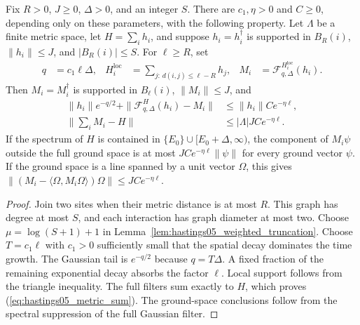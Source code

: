 \begin{lemma}
    \label{thm:hastings05_metric_filter}
    \leanok
    Fix $R>0$, $J\ge0$, $\Delta>0$, and an integer $S$. There are
    $c_1,\eta>0$ and $C\ge0$, depending only on these parameters, with
    the following property. Let $\Lambda$ be a finite metric space, let
    $H=\sum_i h_i$, and suppose $h_i=h_i^\dagger$ is supported in
    $B_R(i)$, $\|h_i\|\le J$, and $|B_R(i)|\le S$. For $\ell\ge R$, set
    \begin{align}
        q&=c_1\ell\Delta,&
        H_i^{\mathrm{loc}}&=\sum_{j:\,d(i,j)\le\ell-R}h_j,&
        M_i&=\mathcal F_{q,\Delta}^{H_i^{\mathrm{loc}}}(h_i).
        \label{eq:hastings05_metric_filter}
    \end{align}
    Then $M_i=M_i^\dagger$ is supported in $B_\ell(i)$,
    $\|M_i\|\le J$, and
    \begin{align}
        \|h_i\|e^{-q/2}
          +\|\mathcal F_{q,\Delta}^{H}(h_i)-M_i\|
        &\le \|h_i\|C e^{-\eta\ell},
        \label{eq:hastings05_metric_budget}\\
        \Big\|\sum_i M_i-H\Big\|
        &\le |\Lambda|JC e^{-\eta\ell}.
        \label{eq:hastings05_metric_sum}
    \end{align}
    If the spectrum of $H$ is contained in
    $\{E_0\}\cup[E_0+\Delta,\infty)$, the component of $M_i\psi$
    outside the full ground space is at most
    $JC e^{-\eta\ell}\|\psi\|$ for every ground vector $\psi$.
    If the ground space is a line spanned by a unit vector $\Omega$, this
    gives $\|(M_i-\langle\Omega,M_i\Omega\rangle)\Omega\|
    \le JC e^{-\eta\ell}$.
\end{lemma}
\begin{proof}\leanok
    Join two sites when their metric distance is at most $R$. This graph
    has degree at most $S$, and each interaction has graph diameter at
    most two. Choose $\mu=\log(S+1)+1$ in
    Lemma~\ref{lem:hastings05_weighted_truncation}. Choose $T=c_1\ell$
    with $c_1>0$ sufficiently small that the spatial decay dominates the
    time growth. The Gaussian tail is $e^{-q/2}$ because $q=T\Delta$.
    A fixed fraction of the remaining exponential decay absorbs the
    factor $\ell$. Local support follows from the triangle inequality.
    The full filters sum exactly to $H$, which proves
    (\ref{eq:hastings05_metric_sum}). The ground-space conclusions
    follow from the spectral suppression of the full Gaussian filter.
\end{proof}

